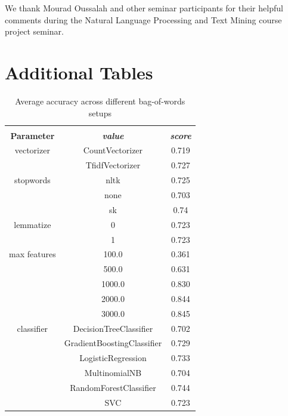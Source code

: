 \documentclass[conference]{IEEEtran}
\begin{document}
We thank Mourad Oussalah and other seminar participants for their helpful comments during
 the Natural Language Processing and Text Mining course project seminar.




\appendices
\section{Additional Tables}
\label{FirstAppendix}

\begin{table}[htbp]
\caption{Average accuracy across different bag-of-words setups}
\begin{center}
\begin{tabular}{|c|c|c|}
\hline
\textbf{}&\multicolumn{2}{|c|}{\textbf{}} \\ 
\cline{2-3}
\textbf{Parameter} & \textbf{\textit{value}}& \textbf{\textit{score}} \\ 
\hline
vectorizer & CountVectorizer & 0.719 \\ 
\cline{2-3}
 & TfidfVectorizer & 0.727 \\ 
\hline
stopwords & nltk & 0.725 \\ 
\cline{2-3}
 & none & 0.703 \\ 
\cline{2-3}
 & sk & 0.74 \\ 
\hline
lemmatize & 0 & 0.723 \\ 
\cline{2-3}
 & 1 & 0.723 \\ 
\hline
max features & 100.0 & 0.361 \\ 
\cline{2-3}
 & 500.0 & 0.631 \\ 
\cline{2-3}
 & 1000.0 & 0.830 \\ 
\cline{2-3}
 & 2000.0 & 0.844 \\ 
\cline{2-3}
 & 3000.0 & 0.845 \\ 
\hline
classifier & DecisionTreeClassifier & 0.702 \\ 
\cline{2-3}
 & GradientBoostingClassifier & 0.729 \\ 
\cline{2-3}
 & LogisticRegression & 0.733 \\ 
\cline{2-3}
 & MultinomialNB & 0.704 \\ 
\cline{2-3}
 & RandomForestClassifier & 0.744 \\ 
\cline{2-3}
 & SVC & 0.723 \\ 
\hline
\end{tabular}
\label{taba5}
\end{center}
\end{table}
\end{document}

